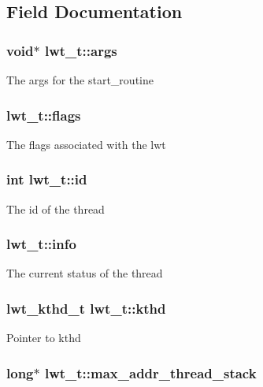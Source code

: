 \subsection{Field Documentation}
\hypertarget{structlwt_a6e870b21b996bc5c62b6cbd04328e784}{
\subsubsection[{args}]{\setlength{\rightskip}{0pt plus 5cm}void$\ast$ lwt\+\_\+t\+::args}}\label{structlwt_a6e870b21b996bc5c62b6cbd04328e784}
The args for the start\+\_\+routine \hypertarget{structlwt_a21694dc7499aff78ea8f90140b0ec60c}{
\subsubsection[{flags}]{ lwt\+\_\+t\+::flags}}\label{structlwt_a21694dc7499aff78ea8f90140b0ec60c}
The flags associated with the lwt \hypertarget{structlwt_aa3df3d76d606756e38bb9bd3d2c2d241}{
\subsubsection[{id}]{\setlength{\rightskip}{0pt plus 5cm}int lwt\+\_\+t\+::id}}\label{structlwt_aa3df3d76d606756e38bb9bd3d2c2d241}
The id of the thread \hypertarget{structlwt_a40641e751624b983f5e1ae5302210e5d}{
\subsubsection[{info}]{ lwt\+\_\+t\+::info}}\label{structlwt_a40641e751624b983f5e1ae5302210e5d}
The current status of the thread \hypertarget{structlwt_acdbe9da0c85d9e466229304aa8d4474f}{
\subsubsection[{kthd}]{\setlength{\rightskip}{0pt plus 5cm}lwt\+\_\+kthd\+\_\+t lwt\+\_\+t\+::kthd}}\label{structlwt_acdbe9da0c85d9e466229304aa8d4474f}
Pointer to kthd \hypertarget{structlwt_ae97cdce617ee026378588f57a999f972}{
\subsubsection[{max\+\_\+addr\+\_\+thread\+\_\+stack}]{\setlength{\rightskip}{0pt plus 5cm}long$\ast$ lwt\+\_\+t\+::max\+\_\+addr\+\_\+thread\+\_\+stack}}\label{structlwt_ae97cdce617ee026378588f57a999f972}

